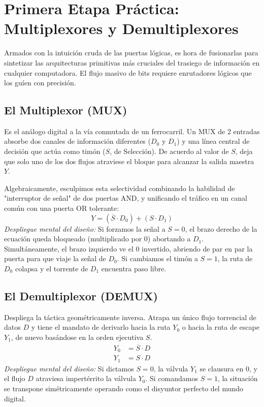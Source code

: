 \section{Primera Etapa Práctica: Multiplexores y Demultiplexores}

Armados con la intuición cruda de las puertas lógicas, es hora de fusionarlas para sintetizar las arquitecturas primitivas más cruciales del trasiego de información en cualquier computadora. El flujo masivo de bits requiere enrutadores lógicos que los guíen con precisión.

\subsection{El Multiplexor (MUX)}
Es el análogo digital a la vía conmutada de un ferrocarril. Un MUX de 2 entradas absorbe dos canales de información diferentes ($D_0$ y $D_1$) y una línea central de decisión que actúa como timón ($S$, de Selección). De acuerdo al valor de $S$, deja que solo uno de los dos flujos atraviese el bloque para alcanzar la salida maestra $Y$.

Algebraicamente, esculpimos esta selectividad combinando la habilidad de "interruptor de señal" de dos puertas AND, y unificando el tráfico en un canal común con una puerta OR tolerante:
\[ Y = (\overline{S} \cdot D_0) + (S \cdot D_1) \]
\textit{Despliegue mental del diseño:} Si forzamos la señal a $S=0$, el brazo derecho de la ecuación queda bloqueado (multiplicado por $0$) abortando a $D_1$. Simultáneamente, el brazo izquierdo ve el $0$ invertido, abriendo de par en par la puerta para que viaje la señal de $D_0$. Si cambiamos el timón a $S=1$, la ruta de $D_0$ colapsa y el torrente de $D_1$ encuentra paso libre.

\subsection{El Demultiplexor (DEMUX)}
Despliega la táctica geométricamente inversa. Atrapa un único flujo torrencial de datos $D$ y tiene el mandato de derivarlo hacia la ruta $Y_0$ o hacia la ruta de escape $Y_1$, de nuevo basándose en la orden ejecutiva $S$. 
\begin{align*}
Y_0 &= \overline{S} \cdot D \\
Y_1 &= S \cdot D
\end{align*}
\textit{Despliegue mental del diseño:} Si dictamos $S=0$, la válvula $Y_1$ se clausura en $0$, y el flujo $D$ atraviesa impertérrito la válvula $Y_0$. Si comandamos $S=1$, la situación se transpone simétricamente operando como el disyuntor perfecto del mundo digital.
